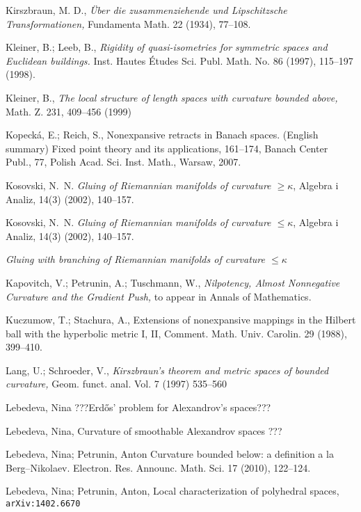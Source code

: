 \begin{thebibliography}{52}
 Kirszbraun, M. D., \textit{\"Uber die zusammenziehende und Lipschitzsche Transformationen,} Fundamenta Math. 22 (1934), 77--108.

  Kleiner, B.; Leeb, B., \textit{Rigidity of quasi-isometries for symmetric spaces and Euclidean buildings.} Inst. Hautes \'Etudes Sci. Publ. Math. No. 86 (1997), 115--197 (1998).

 Kleiner, B.,  \textit{The local structure of length spaces
with curvature bounded above,} Math. Z. 231, 409--456 (1999)

Kopeck\'a, E.; Reich, S.,
Nonexpansive retracts in Banach spaces. (English summary) Fixed point theory and its applications, 161--174, 
Banach Center Publ., 77, Polish Acad. Sci. Inst. Math., Warsaw, 2007. 

Kosovski, N.~N. 
\textit{Gluing of Riemannian manifolds of curvature $\geq \kappa$}, Algebra i Analiz, 14(3) (2002), 140--157.

Kosovski, N.~N. 
\textit{Gluing of Riemannian manifolds of curvature $\leq \kappa$}, Algebra i Analiz, 14(3) (2002), 140--157.

\textit{Gluing with branching of {R}iemannian manifolds of curvature $\leq \kappa$}

 Kapovitch, V.; Petrunin, A.; Tuschmann, W.,  \textit{Nilpotency, Almost Nonnegative Curvature and the Gradient Push,} to appear in Annals of Mathematics.

 Kuczumow, T.; Stachura, A., Extensions of nonexpansive mappings in
the Hilbert ball with the hyperbolic metric I, II, Comment. Math. Univ.
Carolin. 29 (1988), 399--410.

  Lang, U.; Schroeder, V., \textit{Kirszbraun's theorem and metric spaces of bounded curvature,} Geom. funct. anal.
Vol. 7 (1997) 535--560

 Lebedeva, Nina ???Erd\H{o}s' problem for Alexandrov's spaces???

 Lebedeva, Nina, Curvature of smoothable Alexandrov spaces ??? 

 Lebedeva, Nina; Petrunin, Anton 
Curvature bounded below: a definition a la Berg--Nikolaev. 
Electron. Res. Announc. Math. Sci. 17 (2010), 122--124.

 Lebedeva, Nina; Petrunin, Anton, 
Local characterization of polyhedral spaces,
{\tt arXiv:1402.6670}


\end{thebibliography}
